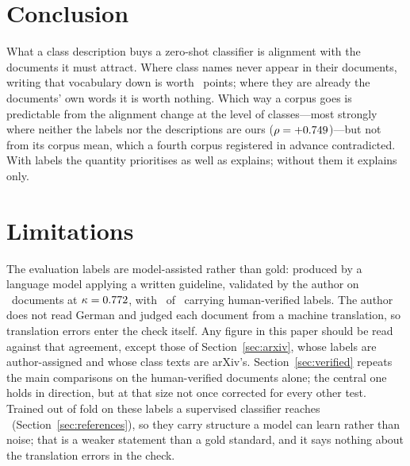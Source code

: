 \documentclass[11pt]{article}
\begin{document}
\section{Conclusion}

What a class description buys a zero-shot classifier is alignment with the
documents it must attract. Where class names never appear in their documents,
writing that vocabulary down is worth \ContentEffect~points; where they are
already the documents' own words it is worth nothing. Which way a corpus goes
is predictable from the alignment change at the level of classes---most
strongly where neither the labels nor the descriptions are ours
($\rho = +0.749$)---but not from its corpus mean, which a fourth corpus
registered in advance contradicted. With labels the quantity prioritises as
well as explains; without them it explains only.

\section*{Limitations}

The evaluation labels are model-assisted rather than gold: produced by a
language model applying a written guideline, validated by the author on
\VerifyN\ documents at $\kappa = 0.772$, with \VerifyN\ of \NEVAL\ carrying human-verified
labels. The author does not read German and judged each document from a machine
translation, so translation errors enter the check itself. Any figure in this
paper should be read against that agreement, except those of
Section~\ref{sec:arxiv}, whose labels are author-assigned and whose class texts
are arXiv's. Section~\ref{sec:verified} repeats
the main comparisons on the human-verified documents alone; the central one
holds in direction, but at that size not once corrected for every other test.
Trained out of fold on these labels a supervised classifier reaches
\RefLRTopOne\ (Section~\ref{sec:references}), so they carry structure a model
can learn rather than noise; that is a weaker statement than a gold standard,
and it says nothing about the translation errors in the check.
\end{document}
